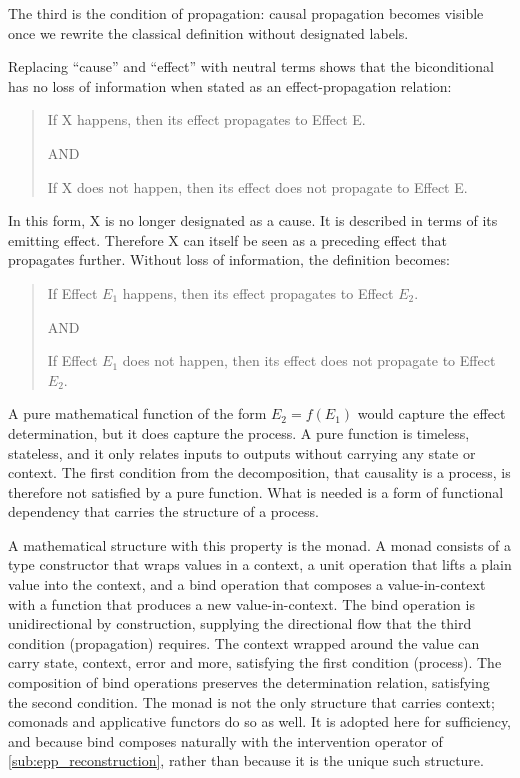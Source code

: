  The third is the condition of propagation: causal propagation becomes visible once we rewrite the classical definition without designated labels. 
 
 \newpage
 
 Replacing ``cause'' and ``effect'' with neutral terms shows that the biconditional has no loss of information when stated as an effect-propagation relation:
 
\begin{quote}
    If X happens, then its effect propagates to Effect E.
 
    AND
    
    If X does not happen, then its effect does not propagate to Effect E.
\end{quote}
 
In this form, X is no longer designated as a cause. It is described in terms of its emitting effect. Therefore X can itself be seen as a preceding effect that propagates further. Without loss of information, the definition becomes:
 
\begin{quote}
	If Effect $E_1$ happens, then its effect propagates to Effect $E_2$.
 
    AND
    
	If Effect $E_1$ does not happen, then its effect does not propagate to Effect $E_2$.
\end{quote}
 
 A pure mathematical function of the form $E_2 = f(E_1)$ would capture the effect determination, but it does capture the process. A pure function is timeless, stateless, and it only relates inputs to outputs without carrying any state or context. The first condition from the decomposition, that causality is a process, is therefore not satisfied by a pure function. What is needed is a form of functional dependency that carries the structure of a process. 
 
A mathematical structure with this property is the monad. A monad consists of a type constructor that wraps values in a context, a unit operation that lifts a plain value into the context, and a bind operation that composes a value-in-context with a function that produces a new value-in-context. The bind operation is unidirectional by construction, supplying the directional flow that the third condition (propagation) requires. The context wrapped around the value can carry state, context, error and more, satisfying the first condition (process). The composition of bind operations preserves the determination relation, satisfying the second condition. The monad is not the only structure that carries context; comonads and applicative functors do so as well. It is adopted here for sufficiency, and because bind composes naturally with the intervention operator of \ref{sub:epp_reconstruction}, rather than because it is the unique such structure.


